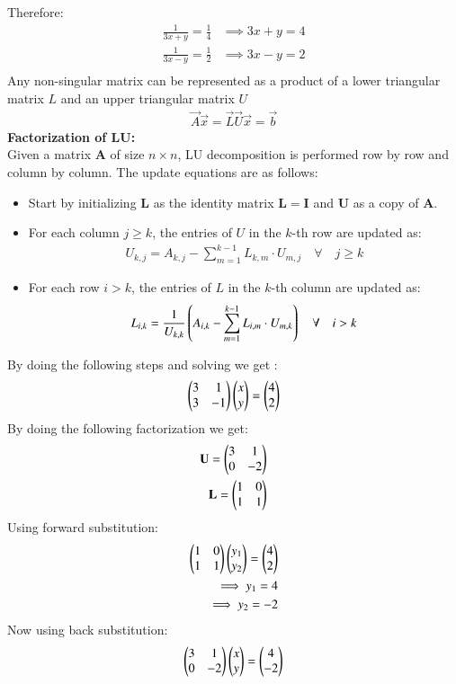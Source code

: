 \documentclass[journal]{IEEEtran}
\begin{document}
Therefore:
\begin{align}
    \frac{1}{3x+y} =\frac{1}{4} &\implies 3x+y=4\\
    \frac{1}{3x-y} = \frac{1}{2} &\implies 3x-y =2\\
\end{align}
Any non-singular matrix can be represented as a product of a lower triangular matrix $L$ and an upper triangular matrix $U$
\begin{align}
	\vec{ A}\vec{x} = \vec{L}\vec{U}\vec{x} = \vec{b}
\end{align}
\textbf{Factorization of LU:}\\
Given a matrix $ \mathbf{A} $ of size $ n \times n $, LU decomposition is performed row by row and column by column. The update equations are as follows: 
\begin{itemize}
    \item Start by initializing $ \mathbf{L} $ as the identity matrix $ \mathbf{L} = \mathbf{I} $ and $ \mathbf{U} $ as a copy of $ \mathbf{A} $.\\
    \item For each column $ j \geq k $, the entries of $ U $ in the $ k $-th row are updated as:
    \begin{align}
        U_{k,j} = A_{k,j} - \sum_{m=1}^{k-1} L_{k,m} \cdot U_{m,j}\quad \forall \quad j \geq k
    \end{align}
    \item For each row $ i > k $, the entries of $ L $ in the $ k $-th column are updated as:
    \begin{align}
        L_{i,k} = \frac{1}{U_{k,k}} \left( A_{i,k} - \sum_{m=1}^{k-1} L_{i,m} \cdot U_{m,k}\right) \quad \forall \quad i > k
    \end{align}
\end{itemize}
By doing the following steps and solving we get :
\begin{align}
    \begin{pmatrix}3 & 1 \\ 3& -1\end{pmatrix}\begin{pmatrix}x\\y\end{pmatrix} = \begin{pmatrix}4\\2\end{pmatrix}
\end{align}
By doing the following factorization we get:
\begin{align}
	\mathbf{U}=\begin{pmatrix}3 & 1\\0 & -2\end{pmatrix} \\
	\mathbf{ L} = \begin{pmatrix}1 & 0\\ 1 & 1\end{pmatrix}
\end{align}
Using forward substitution:
\begin{align}
    \begin{pmatrix}1 & 0\\ 1 & 1\end{pmatrix}\begin{pmatrix}y_1\\y_2\end{pmatrix} = \begin{pmatrix}4\\2\end{pmatrix}\\
    \implies y_1 =4\\
    \implies y_2 =-2
\end{align}
Now using back substitution:
\begin{align}
    \begin{pmatrix}3 & 1\\0 & -2\end{pmatrix}\begin{pmatrix}x\\y\end{pmatrix} = \begin{pmatrix}4\\ -2\end{pmatrix}
\end{align}
\end{document}
